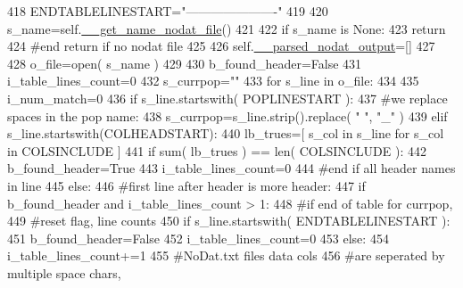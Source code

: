 \begin{DoxyCode}
418         ENDTABLELINESTART=\textcolor{stringliteral}{"----------------------"}  
419 
420         s\_name=self.\hyperlink{classnegui_1_1pgoutputneestimator_1_1PGOutputNeEstimator_ab1fea13d322982ecc8b5fbe42741de50}{\_\_get\_name\_nodat\_file}()
421 
422         \textcolor{keywordflow}{if} s\_name \textcolor{keywordflow}{is} \textcolor{keywordtype}{None}:
423             \textcolor{keywordflow}{return}
424         \textcolor{comment}{#end return if no nodat file}
425 
426         self.\hyperlink{classnegui_1_1pgoutputneestimator_1_1PGOutputNeEstimator_acd31d6f910fc03d1945e38b6c4fa79c0}{\_\_parsed\_nodat\_output}=[]
427 
428         o\_file=open( s\_name )
429 
430         b\_found\_header=\textcolor{keyword}{False}
431         i\_table\_lines\_count=0
432         s\_currpop=\textcolor{stringliteral}{""}
433         \textcolor{keywordflow}{for} s\_line \textcolor{keywordflow}{in} o\_file:
434 
435             i\_num\_match=0
436             \textcolor{keywordflow}{if} s\_line.startswith( POPLINESTART ):
437                 \textcolor{comment}{#we replace spaces in the pop name:}
438                 s\_currpop=s\_line.strip().replace( \textcolor{stringliteral}{" "}, \textcolor{stringliteral}{"\_"} )
439             \textcolor{keywordflow}{elif} s\_line.startswith(COLHEADSTART):
440                 lb\_trues=[ s\_col \textcolor{keywordflow}{in} s\_line \textcolor{keywordflow}{for} s\_col \textcolor{keywordflow}{in} COLSINCLUDE ]
441                 \textcolor{keywordflow}{if} sum( lb\_trues ) == len( COLSINCLUDE ):
442                     b\_found\_header=\textcolor{keyword}{True}
443                     i\_table\_lines\_count=0
444                 \textcolor{comment}{#end if all header names in line}
445             \textcolor{keywordflow}{else}:
446                 \textcolor{comment}{#first line after header is more header:}
447                 \textcolor{keywordflow}{if} b\_found\_header \textcolor{keywordflow}{and} i\_table\_lines\_count > 1:
448                     \textcolor{comment}{#if end of table for currpop, }
449                     \textcolor{comment}{#reset flag, line counts}
450                     \textcolor{keywordflow}{if} s\_line.startswith( ENDTABLELINESTART ):
451                         b\_found\_header=\textcolor{keyword}{False}
452                         i\_table\_lines\_count=0
453                     \textcolor{keywordflow}{else}:
454                         i\_table\_lines\_count+=1
455                         \textcolor{comment}{#NoDat.txt files data cols}
456                         \textcolor{comment}{#are seperated by multiple space chars,}

\end{DoxyCode}
